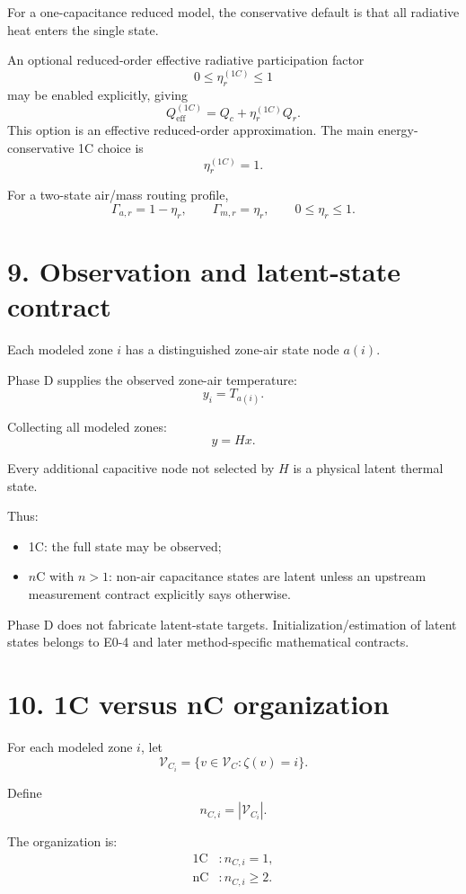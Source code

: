 \documentclass[11pt]{article}
\newcommand{\Vc}{\mathcal{V}_{C}}
\begin{document}
For a one-capacitance reduced model, the conservative default is that all
radiative heat enters the single state.

An optional reduced-order effective radiative participation factor
\[
0\le \eta_r^{(1C)}\le1
\]
may be enabled explicitly, giving
\[
Q_{\mathrm{eff}}^{(1C)}
=
Q_c+\eta_r^{(1C)}Q_r.
\]
This option is an effective reduced-order approximation.  The main
energy-conservative 1C choice is
\[
\boxed{\eta_r^{(1C)}=1.}
\]

For a two-state air/mass routing profile,
\[
\boxed{
\Gamma_{a,r}=1-\eta_r,
\qquad
\Gamma_{m,r}=\eta_r,
\qquad
0\le\eta_r\le1.
}
\tag{E0.3-8}
\]

\section*{9. Observation and latent-state contract}

Each modeled zone $i$ has a distinguished zone-air state node $a(i)$.

Phase D supplies the observed zone-air temperature:
\[
\boxed{
y_i=T_{a(i)}.
}
\]

Collecting all modeled zones:
\[
\boxed{y=Hx.}
\tag{E0.3-9}
\]

Every additional capacitive node not selected by $H$ is a physical latent
thermal state.

Thus:
\begin{itemize}
    \item 1C: the full state may be observed;
    \item $n$C with $n>1$: non-air capacitance states are latent unless an
          upstream measurement contract explicitly says otherwise.
\end{itemize}

Phase D does not fabricate latent-state targets.
Initialization/estimation of latent states belongs to E0-4 and later
method-specific mathematical contracts.

\section*{10. 1C versus nC organization}

For each modeled zone $i$, let
\[
\Vc_i=\{v\in\Vc:\zeta(v)=i\}.
\]

Define
\[
n_{C,i}=|\Vc_i|.
\]

The organization is:
\begin{align*}
\text{1C} &: n_{C,i}=1,\\
\text{nC} &: n_{C,i}\ge 2.
\end{align*}
\end{document}
